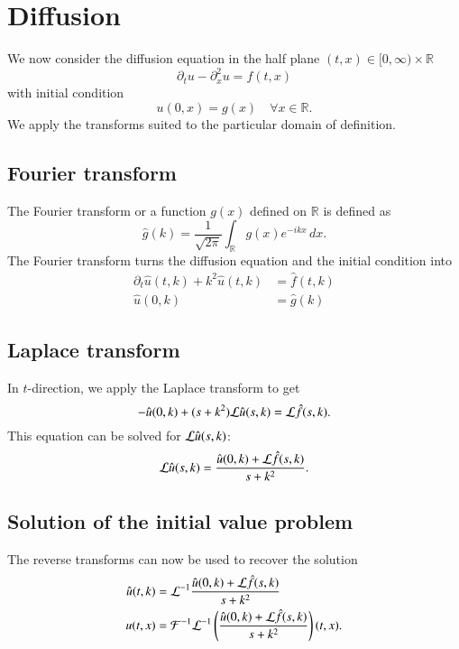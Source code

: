 %
%
%
\section{Diffusion}
We now consider the diffusion equation in the half plane
$(t,x)\in[0,\infty)\times \mathbb R$
\[
\partial_tu-\partial_x^2u=f(t,x)
\]
with initial condition
\[
u(0,x)=g(x)\quad \forall x\in\mathbb R.
\]
We apply the transforms suited to the particular domain of definition.

\subsection{Fourier transform}
The Fourier transform or a function $g(x)$ defined on $\mathbb R$ is
defined as
\[
\hat g(k)=\frac1{\sqrt{2\pi}}\int_{\mathbb R}g(x)e^{-ikx}\,dx.
\]
The Fourier transform turns the diffusion equation and the initial
condition into
\begin{align*}
\partial_t \hat u(t,k)+k^2\hat u(t,k)&=\hat f(t,k)\\
\hat u(0,k)&=\hat g(k)
\end{align*}

\subsection{Laplace transform}
In $t$-direction, we apply the Laplace transform to get
\[
-\hat u(0,k)+(s+k^2){\cal L}\hat u(s,k)={\cal L}\hat f(s,k).
\]
This equation can be solved for ${\cal L}\hat u(s,k)$:
\[
{\cal L}\hat u(s,k)=\frac{\hat u(0,k)+{\cal L}\hat f(s,k)}{s+k^2}.
\]

\subsection{Solution of the initial value problem}
The reverse transforms can now be used to recover the solution
\begin{align*}
\hat u(t,k)&={\cal L}^{-1}
\frac{\hat u(0,k)+{\cal L}\hat f(s,k)}{s+k^2}
\\
u(t,x)&={\cal F}^{-1}{\cal L}^{-1}
\left(\frac{\hat u(0,k)+{\cal L}\hat f(s,k)}{s+k^2}\right)(t,x).
\end{align*}

